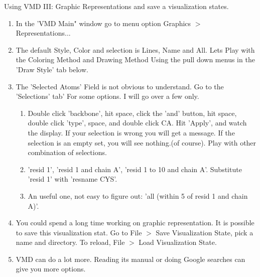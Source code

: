 \documentclass{beamer}
\begin{document}
\begin{frame}[shrink=15]{Using VMD III: Graphic Representations and save a visualization states.}
   \begin{enumerate}
      \item In the 'VMD Main" window go to menu option Graphics $>$ Representations...
      \item The default Style, Color and selection is Lines, Name and All. Lets Play with the Coloring Method and Drawing Method
            Using the pull down menus in the 'Draw Style' tab below.
      \item The 'Selected Atoms' Field is not obvious to understand. Go to the 'Selections' tab' For some options. I will go over a few only.
      \begin{enumerate}
          \item Double click 'backbone', hit space, click the 'and' button, hit space, double click 'type', space, and double click CA. Hit 'Apply',
                and watch the display. If your selection is wrong you will get a message. If the selection is an empty set, you will see nothing.(of course).
                Play with other combination of selections.
          \item 'resid 1', 'resid 1 and chain A', 'resid 1 to 10 and chain A'. Substitute 'resid 1' with 'resname CYS'.
          \item An useful one, not easy to figure out: 'all (within 5 of resid 1 and chain A)'.
      \end{enumerate}
      \item You could spend a long time working on graphic representation. It is possible to save this visualization stat.
            Go to File $>$ Save Visualization State, pick a name and directory. To reload, File $>$ Load Visualization State.
      \item VMD can do a lot more. Reading its manual or doing Google searches can give you more options. 
   \end{enumerate}
\end{frame}
\end{document}
